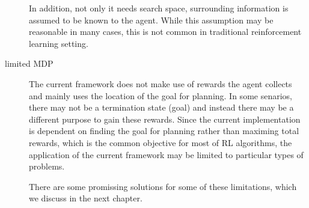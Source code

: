 \begin{description}
In addition, not only it needs search space, surrounding information is assumed to be known to the agent. 
While this assumption may be reasonable in many cases, this is not common in traditional reinforcement learning setting.

\item[limited MDP]
The current framework does not make use of rewards the agent collects and mainly uses the location of the goal for planning.
In some senarios, there may not be a termination state (goal) and instead there may be a different purpose to gain these rewards. 
Since the current implementation is dependent on finding the goal for planning rather than maximing total rewards, which is the common objective for most of RL algorithms,
the application of the current framework may be limited to particular types of problems.

There are some promissing solutions for some of these limitations, which we discuss in the next chapter.

\end{description}  

